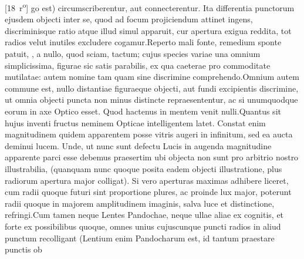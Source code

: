 [18~r\textsuperscript{o}] go est) circumscriberentur, aut connecterentur. Ita differentia punctorum ejusdem objecti inter se, quod ad focum\protect{} projiciendum attinet ingens, discriminisque ratio atque illud simul apparuit, cur apertura exigua reddita, tot radios velut inutiles excludere cogamur.\pend \pstart  Reperto mali fonte, remedium sponte patuit, \protect{}\linebreak {}, a nullo, quod sciam, tactum; cujus species variae una omnium simplicissima, figurae sic satis parabilis, ex qua caeterae pro commoditate mutilatae: \protect{}autem nomine tam \protect{}quam \protect{}sine discrimine comprehendo.\pend \pstart  Omnium autem commune est, nullo distantiae figuraeque objecti, aut fundi excipientis discrimine, ut omnia objecti puncta non minus distincte repraesententur, ac si unumquodque eorum in axe Optico\protect{} esset. Quod hactenus in mentem venit nulli.\pend \pstart  Quantus sit hujus inventi fructus neminem Opticae intelligentem latet. Constat enim magnitudinem quidem apparentem posse vitris augeri in infinitum, sed ea aucta deminui lucem\protect{}. Unde, ut nunc sunt \protect{} defectu Lucis\protect{} in augenda magnitudine apparente parci esse debemus praesertim ubi objecta non sunt pro arbitrio nostro illustrabilia, (quanquam nunc quoque posita eadem objecti illustratione, plus radiorum apertura major colligat). Si vero aperturas maximas adhibere liceret, cum radii quoque futuri sint proportione plures, ac proinde lux\protect{} major, poterunt radii quoque in majorem amplitudinem imaginis, salva luce\protect{} et distinctione, refringi.\pend \pstart  Cum tamen neque Lentes Pandochae\protect{}, neque ullae aliae ex cognitis, et forte ex possibilibus quoque, omnes unius cujuscunque puncti radios in aliud punctum recolligant (Lentium\protect{} enim Pandocharum est, id tantum praestare punctis ob~